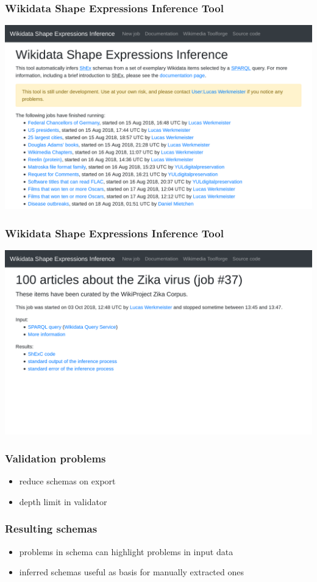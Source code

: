 \documentclass[aspectratio=169]{beamer}
\begin{document}
\begin{frame}
  \frametitle{Wikidata Shape Expressions Inference Tool}
  \includegraphics[width=\textwidth]{../screenshots/wdsi-index}
\end{frame}

\begin{frame}
  \frametitle{Wikidata Shape Expressions Inference Tool}
  \includegraphics[width=\textwidth]{../screenshots/wdsi-zika}
\end{frame}

\begin{frame}
  \frametitle{Validation problems}
  \begin{itemize}
  \item reduce schemas on export
  \item depth limit in validator
  \end{itemize}
\end{frame}

\begin{frame}
  \frametitle{Resulting schemas}
  \begin{itemize}
  \item problems in schema can highlight problems in input data
  \item inferred schemas useful as basis for manually extracted ones
  \end{itemize}
\end{frame}
\end{document}
